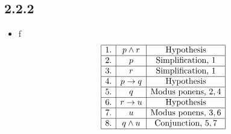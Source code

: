 \documentclass{article}
\begin{document}
\subsection*{2.2.2}
\begin{itemize}
    \item f
    $$
        \begin{array}{|c|c|c|}
            \hline
            1. & p \land r & \text{Hypothesis} \\
            \hline
            2. & p & \text{Simplification, } 1 \\
            \hline
            3. & r & \text{Simplification, } 1 \\
            \hline
            4. & p \rightarrow q & \text{Hypothesis} \\
            \hline
            5. & q & \text{Modus ponens, } 2,4 \\
            \hline
            6. & r \rightarrow u & \text{Hypothesis} \\
            \hline
            7. & u & \text{Modus ponens, } 3,6 \\
            \hline
            8. & q \land u & \text{Conjunction, } 5,7 \\
            \hline
        \end{array}
    $$
\end{itemize}
\end{document}
